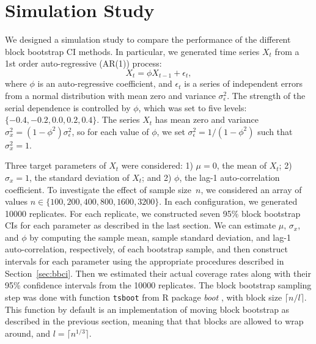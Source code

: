 \documentclass[12pt, letterpaper, titlepage]{article}
\begin{document}
\section{Simulation Study}
\label{sec:simu}

We designed a simulation study to compare the performance of the different
block
bootstrap CI methods. In particular, we generated time series $X_t$
from a 1st order auto-regressive (AR(1)) process:
\[
X_t = \phi X_{t-1} + \epsilon_t,
\]
where $\phi$ is an auto-regressive coefficient, and $\epsilon_t$ is a series of
independent errors from a normal distribution with mean zero and variance
$\sigma_{\epsilon}^2$. The strength of the serial dependence is controlled by
$\phi$, which was set to five levels: $\{-0.4, -0.2, 0.0, 0.2, 0.4\}$.
The series $X_t$ has mean zero and variance
$\sigma_x^2 = (1 - \phi^2) \sigma_{\epsilon}^2$, so for each value of $\phi$,
we
set $\sigma_{\epsilon}^2 = 1 / (1 - \phi^2)$ such that $\sigma_x^2 = 1$.


Three target parameters of $X_t$ were considered:
1) $\mu = 0$, the mean of $X_t$;
2) $\sigma_x = 1$, the standard deviation of $X_t$; and
2) $\phi$, the lag-1 auto-correlation coefficient.
To investigate the effect of sample size~$n$, we considered an array of values
$n \in \{100, 200, 400, 800, 1600, 3200\}$. In each configuration, we generated 
10000 replicates. For each replicate, we constructed seven 95\% block bootstrap
CIs for each parameter as described in the last section. We can estimate 
$\mu$, $\sigma_x$, and $\phi$ by computing the sample mean, sample 
standard deviation,
and lag-1 auto-correlation, respectively, of each bootstrap sample, and then 
construct intervals for each parameter using the appropriate procedures
described in Section~\ref{sec:bbci}.
Then we estimated their actual coverage rates along with their 95\% confidence
intervals from the 10000 replicates. The block bootstrap sampling step was done
with function \texttt{tsboot} from R package \textsl{boot} \citep{boot}, with
block size $\lceil n / l \rceil$. This function by default is an implementation
of moving block bootstrap as described in the previous section, meaning that
that blocks are allowed to wrap around, and $l = \lceil n^{1/3} \rceil$.
\end{document}
